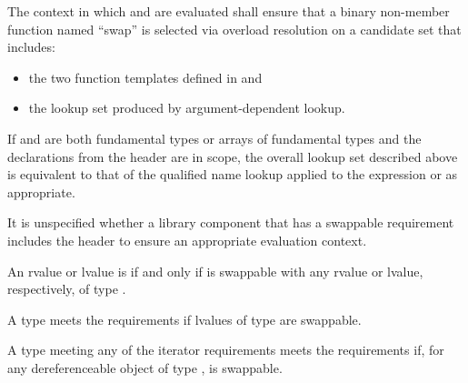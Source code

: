 \pnum
The context in which  and  are evaluated shall
ensure that a binary non-member function named ``swap'' is selected via overload
resolution on a candidate set that includes:
\begin{itemize}
\item the two  function templates defined in
 and

\item the lookup set produced by argument-dependent lookup.
\end{itemize}
\begin{note}
If  and  are both fundamental types or arrays of
fundamental types and the declarations from the header  are in
scope, the overall lookup set described above is equivalent to that of the
qualified name lookup applied to the expression  or
 as appropriate.
\end{note}
\begin{note}
It is unspecified whether a library component that has a swappable
requirement includes the header  to ensure an appropriate
evaluation context.
\end{note}

\pnum
An rvalue or lvalue  is  if and only if  is
swappable with any rvalue or lvalue, respectively, of type .

\pnum
A type  meets the  requirements
if lvalues of type  are swappable.

\pnum
A type  meeting any of the iterator requirements
meets the  requirements if,
for any dereferenceable object
 of type ,
 is swappable.

